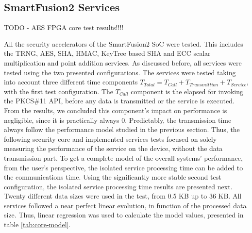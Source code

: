 \subsection{SmartFusion2 Services}\label{chap:evaluation:board}

TODO - AES FPGA core test results!!!!

All the security accelerators of the SmartFusion2 SoC were tested. This includes the TRNG, AES, SHA, HMAC, KeyTree based SHA and ECC scalar multiplication and point addition services.
As discussed before, all services were tested using the two presented configurations. The services were tested taking into account three different time components \(T_{Total} = T_{Call} + T_{Transmittion} + T_{Service}\), with the first test configuration. The \(T_{Call}\) component is the elapsed for invoking the PKCS\#11 API, before any data is transmitted or the service is executed. From the results, we concluded this component's impact on performance is negligible, since it is practically always 0.
Predictably, the transmission time always follow the performance model studied in the previous section.
Thus, the following security core and implemented services tests focused on solely measuring the performance of the service on the device, without the data transmission part. To get a complete model of the overall systems' performance, from the user's perspective, the isolated service processing time can be added to the communications time.
Using the significantly more stable second test configuration, the isolated service processing time results are presented next.
Twenty different data sizes were used in the test, from 0.5 KB up to 36 KB.
All services followed a near perfect linear evolution, in function of the processed data size. Thus, linear regression was used to calculate the model values, presented in table \ref{tab:core-model}.



